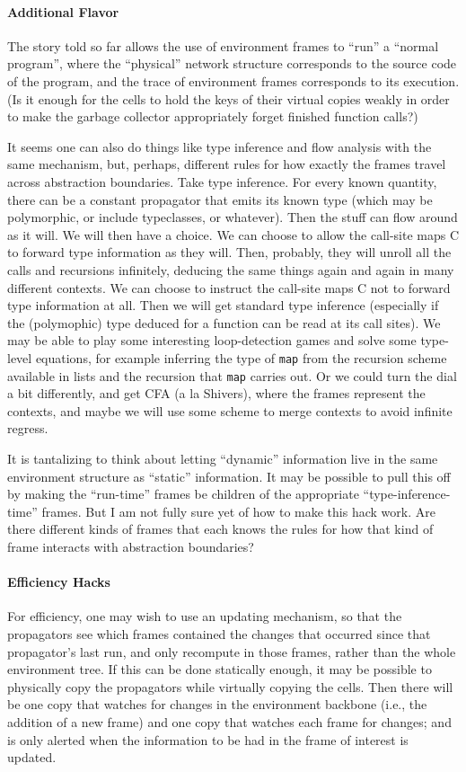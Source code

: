 \documentclass{article}
\newcommand{\code}[1]{{\tt #1}}
\begin{document}
\paragraph{Additional Flavor}
The story told so far allows the use of environment frames to
``run'' a ``normal program'', where the ``physical'' network structure
corresponds to the source code of the program, and the trace of
environment frames corresponds to its execution.  (Is it enough
for the cells to hold the keys of their virtual copies weakly in
order to make the garbage collector appropriately forget finished
function calls?)

It seems one can also do things like type inference and
flow analysis with the same mechanism, but, perhaps, different
rules for how exactly the frames travel across abstraction
boundaries.  Take type inference.  For every known quantity, there
can be a constant propagator that emits its known type (which may
be polymorphic, or include typeclasses, or whatever).  Then the
stuff can flow around as it will.  We will then have a choice.  We
can choose to allow the call-site maps C to forward type
information as they will.  Then, probably, they will unroll all
the calls and recursions infinitely, deducing the same things
again and again in many different contexts.  We can choose to
instruct the call-site maps C not to forward type information at
all.  Then we will get standard type inference (especially if the
(polymophic) type deduced for a function can be read at its call
sites).  We may be able to play some interesting loop-detection
games and solve some type-level equations, for example inferring
the type of \code{map} from the recursion scheme available in lists and
the recursion that \code{map} carries out.  Or we could turn the dial a
bit differently, and get CFA (a la Shivers), where the frames
represent the contexts, and maybe we will use some scheme to merge
contexts to avoid infinite regress.

It is tantalizing to think about letting ``dynamic'' information
live in the same environment structure as ``static'' information.
It may be possible to pull this off by making the ``run-time''
frames be children of the appropriate ``type-inference-time''
frames.  But I am not fully sure yet of how to make this hack
work.  Are there different kinds of frames that each knows the
rules for how that kind of frame interacts with abstraction
boundaries?

\paragraph{Efficiency Hacks}
For efficiency, one may wish to use an updating mechanism, so that
the propagators see which frames contained the changes that
occurred since that propagator's last run, and only recompute in
those frames, rather than the whole environment tree.  If this can
be done statically enough, it may be possible to physically copy
the propagators while virtually copying the cells.  Then there
will be one copy that watches for changes in the environment
backbone (i.e., the addition of a new frame) and one copy that
watches each frame for changes; and is only alerted when the
information to be had in the frame of interest is updated.
\end{document}
